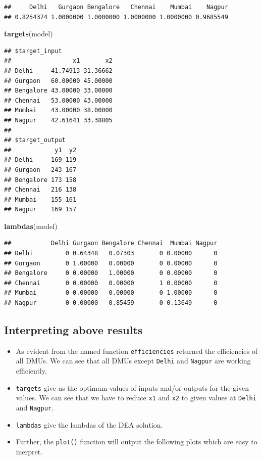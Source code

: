 \documentclass[
]{book}
\newenvironment{Shaded}{\begin{snugshade}}{\end{snugshade}}
\newcommand{\FunctionTok}[1]{\textcolor[rgb]{0.13,0.29,0.53}{\textbf{#1}}}
\newcommand{\NormalTok}[1]{#1}
\providecommand{\tightlist}{%
  \setlength{\itemsep}{0pt}\setlength{\parskip}{0pt}}
\begin{document}
\begin{verbatim}
##     Delhi   Gurgaon Bengalore   Chennai    Mumbai    Nagpur 
## 0.8254374 1.0000000 1.0000000 1.0000000 1.0000000 0.9685549
\end{verbatim}

\begin{Shaded}
\begin{Highlighting}[]
\FunctionTok{targets}\NormalTok{(model)}
\end{Highlighting}
\end{Shaded}

\begin{verbatim}
## $target_input
##                 x1       x2
## Delhi     41.74913 31.36662
## Gurgaon   60.00000 45.00000
## Bengalore 43.00000 33.00000
## Chennai   53.00000 43.00000
## Mumbai    43.00000 38.00000
## Nagpur    42.61641 33.38805
## 
## $target_output
##            y1  y2
## Delhi     169 119
## Gurgaon   243 167
## Bengalore 173 158
## Chennai   216 138
## Mumbai    155 161
## Nagpur    169 157
\end{verbatim}

\begin{Shaded}
\begin{Highlighting}[]
\FunctionTok{lambdas}\NormalTok{(model)}
\end{Highlighting}
\end{Shaded}

\begin{verbatim}
##           Delhi Gurgaon Bengalore Chennai  Mumbai Nagpur
## Delhi         0 0.64348   0.07303       0 0.00000      0
## Gurgaon       0 1.00000   0.00000       0 0.00000      0
## Bengalore     0 0.00000   1.00000       0 0.00000      0
## Chennai       0 0.00000   0.00000       1 0.00000      0
## Mumbai        0 0.00000   0.00000       0 1.00000      0
## Nagpur        0 0.00000   0.85459       0 0.13649      0
\end{verbatim}

\hypertarget{interpreting-above-results}{%
\subsection{Interpreting above results}\label{interpreting-above-results}}

\begin{itemize}
\tightlist
\item
  As evident from the named function \texttt{efficiencies} returned the efficiencies of all DMUs. We can see that all DMUs except \texttt{Delhi} and \texttt{Nagpur} are working efficiently.
\item
  \texttt{targets} give us the optimum values of inputs and/or outputs for the given values. We can see that we have to reduce \texttt{x1} and \texttt{x2} to given values at \texttt{Delhi} and \texttt{Nagpur}.
\item
  \texttt{lambdas} give the lambdas of the DEA solution.
\item
  Further, the \texttt{plot()} function will output the following plots which are easy to inerpret.
\end{itemize}
\end{document}
